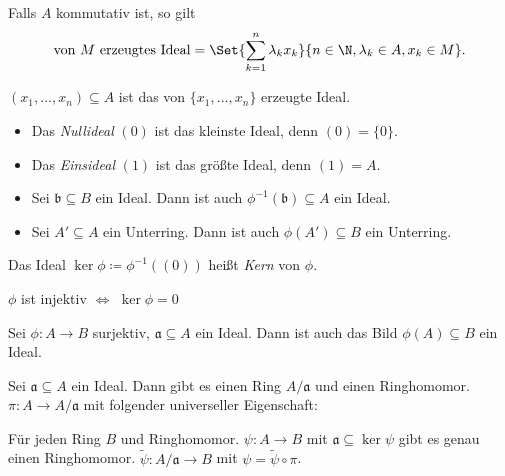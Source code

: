 \documentclass{cheat-sheet}
\newcommand{\aaa}{\mathfrak{a}}
\newcommand{\bbb}{\mathfrak{b}}
\begin{document}
\begin{bem}
  Falls $A$ kommutativ ist, so gilt
  \[
    \text{von $M$ erzeugtes Ideal} = \Set{\sum_{k=1}^n \lambda_k x_k}{n \in \N, \lambda_k \in A, x_k \in M}.
  \]
\end{bem}

\begin{nota}
  $(x_1, \ldots, x_n) \subseteq A$ ist das von $\{ x_1, \ldots, x_n \}$ erzeugte Ideal.
\end{nota}

\begin{bem}
  \begin{minipage}[t]{0.85 \linewidth}
    \begin{itemize}
      \item Das \emph{Nullideal} $(0)$ ist das kleinste Ideal, denn $(0) = \{ 0 \}$.
      \item Das \emph{Einsideal} $(1)$ ist das größte Ideal, denn $(1) = A$.
    \end{itemize}
  \end{minipage}
\end{bem}


\begin{prop}
  \begin{itemize}
    \item Sei $\bbb \subseteq B$ ein Ideal.
    Dann ist auch $\phi^{-1}(\bbb) \subseteq A$ ein Ideal.
    \item Sei $A' \subseteq A$ ein Unterring.
    Dann ist auch $\phi(A') \subseteq B$ ein Unterring.
  \end{itemize}
\end{prop}

\begin{defn}
  Das Ideal $\ker \phi \coloneqq \phi^{-1}((0))$ heißt \emph{Kern} von $\phi$.
\end{defn}

\begin{bem}
  $\phi$ ist injektiv $\iff$ $\ker \phi = 0$
\end{bem}

\begin{prop}
  Sei $\phi : A \to B$ surjektiv, $\aaa \subseteq A$ ein Ideal.
  Dann ist auch das Bild $\phi(A) \subseteq B$ ein Ideal.
\end{prop}


\begin{prop}
  Sei $\aaa \subseteq A$ ein Ideal.
  Dann gibt es einen Ring $A/\aaa$ und einen Ringhomomor. $\pi : A \to A/\aaa$ mit folgender universeller Eigenschaft:

  \hfill\begin{minipage}{0.95 \linewidth}
    Für jeden Ring $B$ und Ringhomomor. $\psi : A \to B$ mit $\aaa \subseteq \ker \psi$ gibt es genau einen Ringhomomor. $\widetilde{\psi} : A/\aaa \to B$ mit $\psi = \widetilde{\psi} \circ \pi$.
  \end{minipage}
\end{prop}
\end{document}
